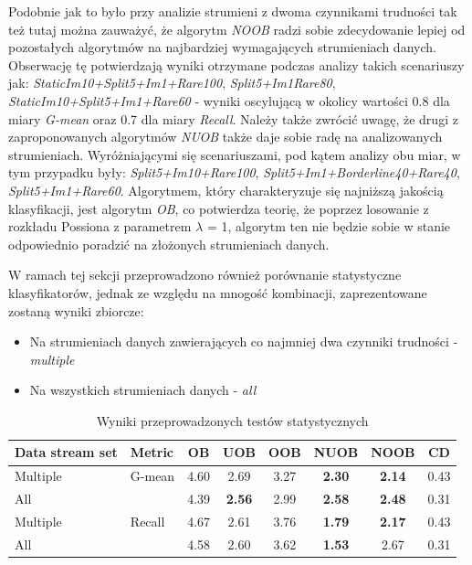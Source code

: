 \noindent Podobnie jak to było przy analizie strumieni z dwoma czynnikami trudności tak też tutaj można zauważyć, że algorytm \textit{NOOB} radzi sobie zdecydowanie lepiej od pozostałych algorytmów na najbardziej wymagających strumieniach danych. Obserwację tę potwierdzają wyniki otrzymane podczas analizy takich scenariuszy jak: \textit{StaticIm10+Split5+Im1+Rare100}, \textit{Split5+Im1Rare80}, \textit{StaticIm10+Split5+Im1+Rare60} - wyniki oscylującą w okolicy wartości 0.8 dla miary \textit{G-mean} oraz 0.7 dla miary \textit{Recall}. Należy także zwrócić uwagę, że drugi z zaproponowanych algorytmów \textit{NUOB} także daje sobie radę na analizowanych strumieniach. Wyróżniającymi się scenariuszami, pod kątem analizy obu miar, w tym przypadku były: \textit{Split5+Im10+Rare100}, \textit{Split5+Im1+Borderline40+Rare40}, \textit{Split5+Im1+Rare60}. Algorytmem, który charakteryzuje się najniższą jakością klasyfikacji, jest algorytm \textit{OB}, co potwierdza teorię, że poprzez losowanie z rozkładu Possiona z parametrem $\lambda$ = 1, algorytm ten nie będzie sobie w stanie odpowiednio poradzić na złożonych strumieniach danych.

W ramach tej sekcji przeprowadzono również porównanie statystyczne klasyfikatorów, jednak ze względu na mnogość kombinacji, zaprezentowane zostaną wyniki zbiorcze:

\begin{itemize}
    \item Na strumieniach danych zawierających co najmniej dwa czynniki trudności - \textit{multiple}
    \item Na wszystkich strumieniach danych - \textit{all}
\end{itemize}

\begin{table}[ht]
\centering\small%
\setlength{\tabcolsep}{10pt} 
\renewcommand{\arraystretch}{1.5} 
\begin{tabular}{l l c c c c c c}
\toprule
Data stream set & Metric & OB & UOB & OOB & NUOB & NOOB & CD \\
\midrule
Multiple & G-mean & 4.60 & 2.69 & 3.27 & \textbf{2.30} & \textbf{2.14} & 0.43 \\
All  & & 4.39 & \textbf{2.56} & 2.99 & \textbf{2.58} & \textbf{2.48} & 0.31 \\
Multiple & Recall & 4.67 & 2.61 & 3.76 & \textbf{1.79} & \textbf{2.17} & 0.43\\
All  & & 4.58 & 2.60 & 3.62 & \textbf{1.53} & 2.67 & 0.31 \\
\bottomrule
\end{tabular}
\caption{Wyniki przeprowadzonych testów statystycznych}\label{Tab:ComplexFriedman}
\end{table}

